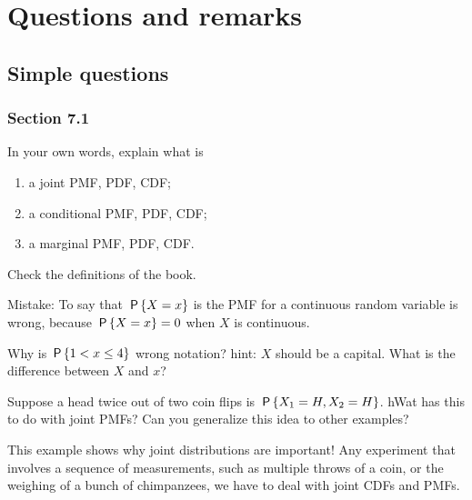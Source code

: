 




\chapter{Questions and remarks}
\label{cha:questions-chapter-7}


\section{Simple questions}

\subsection*{Section 7.1}


\begin{exercise}
In your own words, explain what is
\begin{enumerate}
\item a joint PMF, PDF, CDF;
\item a conditional PMF, PDF, CDF;
\item a marginal PMF, PDF, CDF.
\end{enumerate}
\begin{solution}
Check the definitions of the book.

Mistake: To say that $\P{X=x}$ is the PMF for a continuous random variable is wrong, because $\P{X=x}=0$ when $X$ is continuous.

Why is $\P{1 < x \leq 4}$ wrong notation?
hint: $X$ should be a capital.
What is the difference between $X$ and $x$?

\end{solution}
\end{exercise}

\begin{exercise}
Suppose  a head twice out of two coin flips is $\P{X_1=H, X_2=H}$.
hWat has this to do with joint PMFs? Can you generalize this idea to other examples?
\begin{solution}
This example shows why joint distributions are important!
Any experiment that involves a sequence of measurements, such as multiple throws of a coin, or the weighing of a bunch of chimpanzees, we have to deal with joint CDFs and PMFs.
\end{solution}
\end{exercise}


